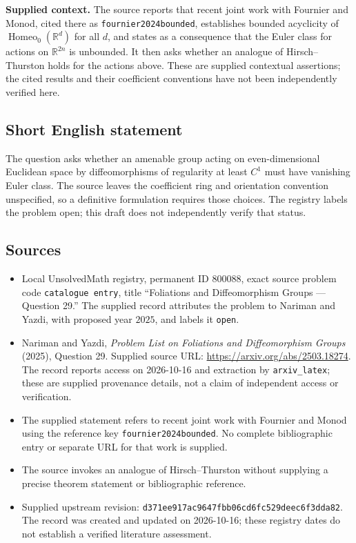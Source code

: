 \documentclass[11pt]{article}
\newcommand{\R}{\mathbb{R}}
\begin{document}
\textbf{Supplied context.} The source reports that recent joint work with Fournier and Monod, cited there as \texttt{fournier2024bounded}, establishes bounded acyclicity of \(\operatorname{Homeo}_0(\R^d)\) for all \(d\), and states as a consequence that the Euler class for actions on \(\R^{2n}\) is unbounded. It then asks whether an analogue of Hirsch--Thurston holds for the actions above. These are supplied contextual assertions; the cited results and their coefficient conventions have not been independently verified here.
\subsection{Short English statement}
The question asks whether an amenable group acting on even-dimensional Euclidean space by diffeomorphisms of regularity at least \(C^1\) must have vanishing Euler class. The source leaves the coefficient ring and orientation convention unspecified, so a definitive formulation requires those choices. The registry labels the problem open; this draft does not independently verify that status.
\subsection{Sources}
\begin{itemize}
\item Local UnsolvedMath registry, permanent ID \(800088\), exact source problem code \texttt{catalogue entry}, title ``Foliations and Diffeomorphism Groups --- Question 29.'' The supplied record attributes the problem to Nariman and Yazdi, with proposed year \(2025\), and labels it \texttt{open}.
\item Nariman and Yazdi, \emph{Problem List on Foliations and Diffeomorphism Groups} (2025), Question 29. Supplied source URL: \url{https://arxiv.org/abs/2503.18274}. The record reports access on 2026-10-16 and extraction by \texttt{arxiv\_latex}; these are supplied provenance details, not a claim of independent access or verification.
\item The supplied statement refers to recent joint work with Fournier and Monod using the reference key \texttt{fournier2024bounded}. No complete bibliographic entry or separate URL for that work is supplied.
\item The source invokes an analogue of Hirsch--Thurston without supplying a precise theorem statement or bibliographic reference.
\item Supplied upstream revision: \texttt{d371ee917ac9647fbb06cd6fc529deec6f3dda82}. The record was created and updated on 2026-10-16; these registry dates do not establish a verified literature assessment.
\end{itemize}
\end{document}
